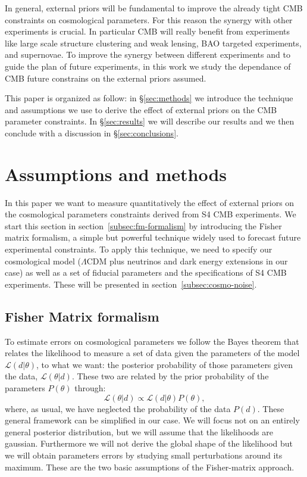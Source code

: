 \documentclass[aps,prd,reprint,superscriptaddress]{revtex4-1}
\newcommand\refsec[1]{\S\ref{sec:#1}}
\newcommand{\refssec}[1]{section~\ref{subsec:#1}}
\begin{document}
In general, external priors will be fundamental to improve the already tight CMB constraints on cosmological parameters. For this reason the synergy with other experiments is crucial. In particular CMB will really benefit from experiments like large scale structure clustering and weak lensing, BAO targeted experiments, and supernovae. 
To improve the synergy between different experiments and to guide the plan of future experiments, in this work we study the dependance of CMB future constrains on the external priors assumed.

This paper is organized as follow: in \refsec{methods} we introduce the technique and assumptions we use to derive the effect of external priors on the CMB parameter constraints. In \refsec{results} we will describe our results and we then conclude with a discussion in \refsec{conclusions}.



\section{Assumptions and methods \label{sec:methods}}
In this paper we want to measure quantitatively the effect of external priors on the  cosmological parameters constraints derived from S4 CMB experiments.
We start this section in \refssec{fm-formalism} by introducing the Fisher matrix formalism, a simple but powerful technique widely used to forecast future experimental constraints. To apply this technique, we need to specify our cosmological model ($\Lambda$CDM plus neutrinos and dark energy extensions in our case) as well as a set of fiducial parameters and the specifications of S4 CMB experiments. These will be presented in \refssec{cosmo-noise}.


\subsection{Fisher Matrix formalism \label{subsec:fm-formalism}}
To estimate errors on cosmological parameters we follow the Bayes theorem that relates the likelihood to measure a set of data given the parameters of the model $\mathcal{L}(d|\theta)$, to what we want: the posterior probability of those parameters given the data, $\mathcal{L}(\theta|d)$.
These two are related by the prior probability of the parameters $P(\theta)$ through:
\begin{equation}
\mathcal{L}(\theta|d)\propto \mathcal{L}(d|\theta)P(\theta),
\end{equation}
where, as usual, we have neglected the probability of the data $P(d)$.
These general framework can be simplified in our case. We will focus not on an entirely general posterior distribution, but we will assume that the likelihoods are gaussian.
Furthermore we will not derive the global shape of the likelihood but we will obtain parameters errors by studying small perturbations around its maximum. These are the two basic assumptions of the Fisher-matrix approach.
\end{document}
